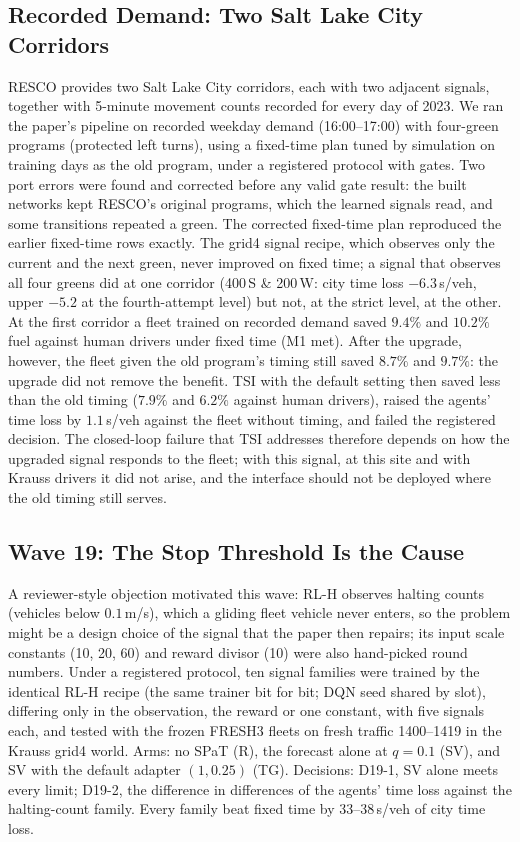 \subsection{Recorded Demand: Two Salt Lake City Corridors}\label{sec:f1}
RESCO \cite{ault2021} provides two Salt Lake City corridors, each with two adjacent signals, together with 5-minute movement counts recorded
for every day of 2023. We ran the paper's pipeline on recorded weekday demand (16:00--17:00) with four-green programs (protected left turns),
using a fixed-time plan tuned by simulation on training days as the old program, under a registered protocol with gates. Two port errors were
found and corrected before any valid gate result: the built networks kept RESCO's original programs, which the learned signals read, and some
transitions repeated a green. The corrected fixed-time plan reproduced the earlier fixed-time rows exactly. The grid4 signal recipe, which
observes only the current and the next green, never improved on fixed time; a signal that observes all four greens did at one corridor
(400\,S \& 200\,W: city time loss $-6.3$\,s/veh, upper $-5.2$ at the fourth-attempt level) but not, at the strict level, at the other. At the
first corridor a fleet trained on recorded demand saved $9.4\%$ and $10.2\%$ fuel against human drivers under fixed time (M1 met). After the
upgrade, however, the fleet given the old program's timing still saved $8.7\%$ and $9.7\%$: the upgrade did not remove the benefit. TSI with
the default setting then saved less than the old timing ($7.9\%$ and $6.2\%$ against human drivers), raised the agents' time loss by
$1.1$\,s/veh against the fleet without timing, and failed the registered decision. The closed-loop failure that TSI addresses therefore
depends on how the upgraded signal responds to the fleet; with this signal, at this site and with Krauss drivers it did not arise, and the
interface should not be deployed where the old timing still serves.

\subsection{Wave 19: The Stop Threshold Is the Cause}\label{sec:w19}
A reviewer-style objection motivated this wave: RL-H observes halting counts (vehicles below $0.1$\,m/s), which a gliding fleet vehicle
never enters, so the problem might be a design choice of the signal that the paper then repairs; its input scale constants (10, 20, 60)
and reward divisor (10) were also hand-picked round numbers. Under a registered protocol, ten signal families were trained by the
identical RL-H recipe (the same trainer bit for bit; DQN seed shared by slot), differing only in the observation, the reward or one
constant, with five signals each, and tested with the frozen FRESH3 fleets on fresh traffic 1400--1419 in the Krauss grid4 world. Arms:
no SPaT (R), the forecast alone at $q=0.1$ (SV), and SV with the default adapter $(1, 0.25)$ (TG). Decisions: D19-1, SV alone meets every
limit; D19-2, the difference in differences of the agents' time loss against the halting-count family. Every family beat fixed time by
33--38\,s/veh of city time loss.
